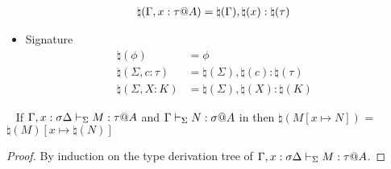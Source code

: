 \begin{dfn}
\begin{multicols}{2}
\begin{itemize}
\begin{align*}
                \natural(\G, x:\tau@A) &= \natural(\G), \natural(x):\natural(\tau) & \\
            \end{align*}
        \item Signature
            \begin{align*}
                \natural(\phi) &= \phi & \\
                \natural(\Sigma, c:\tau) &= \natural(\Sigma),\natural(c):\natural(\tau) & \\
                \natural(\Sigma, X:K) &= \natural(\Sigma), \natural(X):\natural(K) &
            \end{align*}
    \end{itemize}
    \end{multicols}
\end{dfn}

\begin{lemma}\
    \label{lemma:SubstitutionAndNatural}
    If \( \G, x:\sigma \D \V M:\tau@A \) and \( \G \V N:\sigma@A\) in \LMD
    then $\natural(M[x \mapsto N])$ = $\natural(M)[x\mapsto\natural(N)]$
\end{lemma}

\begin{proof}
    By induction on the type derivation tree of $\G, x:\sigma \D \V M:\tau@A$.
\end{proof}

